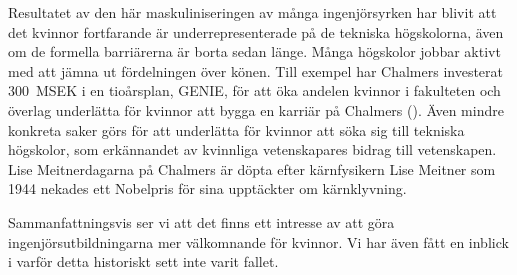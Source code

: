 Resultatet av den här maskuliniseringen av många ingenjörsyrken har blivit att det kvinnor fortfarande är underrepresenterade på de tekniska högskolorna, även om de formella barriärerna är borta sedan länge. Många högskolor jobbar aktivt med att jämna ut fördelningen över könen. Till exempel har Chalmers investerat \SI{300}{\mega SEK} i en tioårsplan, GENIE, för att öka andelen kvinnor i fakulteten och överlag underlätta för kvinnor att bygga en karriär på Chalmers (\cite{genie}). Även mindre konkreta saker görs för att underlätta för kvinnor att söka sig till tekniska högskolor, som erkännandet av kvinnliga vetenskapares bidrag till vetenskapen. Lise Meitnerdagarna på Chalmers är döpta efter kärnfysikern Lise Meitner som 1944 nekades ett Nobelpris för sina upptäckter om kärnklyvning.

Sammanfattningsvis ser vi att det finns ett intresse av att göra ingenjörsutbildningarna mer välkomnande för kvinnor. Vi har även fått en inblick i varför detta historiskt sett inte varit fallet.







\appendix
\printbibliography

